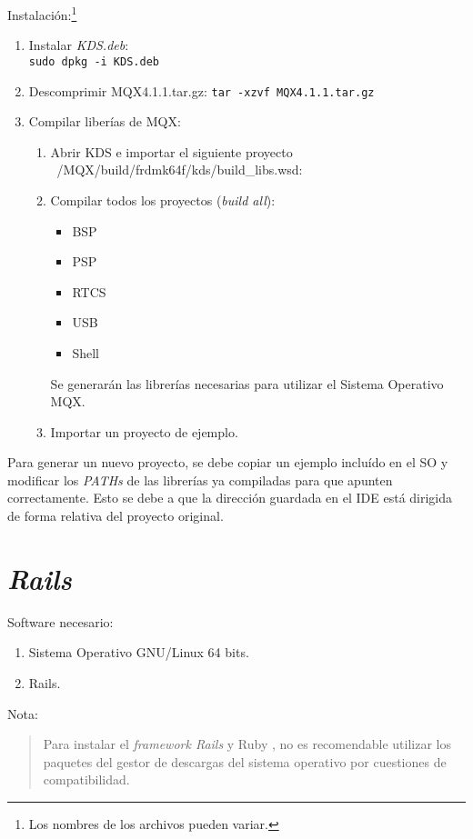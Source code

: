 Instalación:\footnote{Los nombres de los archivos pueden variar.}
\begin{enumerate}
\item Instalar \textit{KDS.deb}: \\
\verb|sudo dpkg -i KDS.deb|
\item Descomprimir MQX4.1.1.tar.gz:
\verb|tar -xzvf MQX4.1.1.tar.gz|
\item Compilar liberías de MQX:
	\begin{enumerate}
	\item Abrir KDS e importar el siguiente proyecto ~/MQX/build/frdmk64f/kds/build\_libs.wsd:
	\item Compilar todos los proyectos (\textit{build all}):	
		\begin{itemize}
		\item BSP
		\item PSP
		\item RTCS
		\item USB
		\item Shell
		\end{itemize}
	Se generarán las librerías necesarias para utilizar el Sistema Operativo	MQX.
	\item Importar un proyecto de ejemplo.	
	\end{enumerate}
\end{enumerate}
Para generar un nuevo proyecto, se debe copiar un ejemplo incluído en el SO y modificar los \textit{PATHs} de las librerías ya compiladas para que apunten correctamente. Esto se debe a que la dirección guardada en el IDE está dirigida de forma relativa del proyecto original. 



\newpage
{}  %

\section{\textit{Rails}} %

Software necesario:
\begin{enumerate}
\item Sistema Operativo GNU/Linux 64 bits.
\item Rails.
\end{enumerate}
Nota:
\begin{quotation}
Para instalar el \textit{framework Rails} y Ruby , no es recomendable utilizar los paquetes del gestor de descargas del sistema operativo por cuestiones de compatibilidad.\\
\end{quotation}

